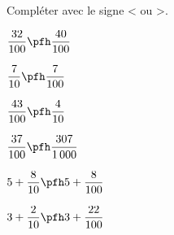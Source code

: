 \begin{colonne*exercice}

\begin{exercice} %
   Compléter avec le signe < ou >. \medskip
   \begin{colenumerate}{2}
      \item $\dfrac{32}{100} \pfh \dfrac{40}{100}$ \medskip
      \item $\dfrac{7}{10} \pfh \dfrac{7}{100}$ \medskip
      \item $\dfrac{43}{100} \pfh \dfrac{4}{10}$ \medskip
      \item $\dfrac{37}{100} \pfh \dfrac{307}{1\,000}$
      \item $5+\dfrac{8}{10} \pfh 5+\dfrac{8}{100}$
      \item $3+\dfrac{2}{10} \pfh 3+\dfrac{22}{100}$
   \end{colenumerate}
\end{exercice}




\end{colonne*exercice}
